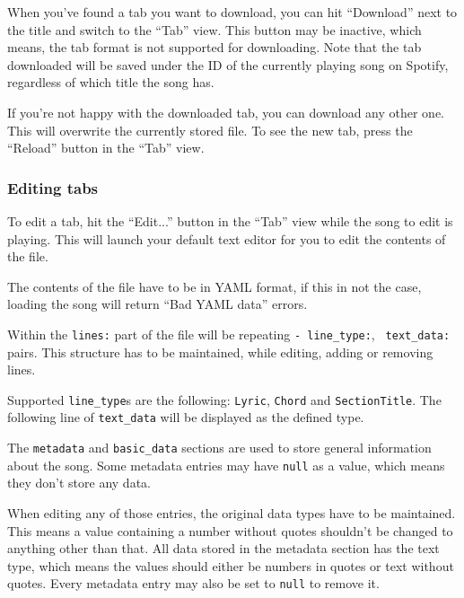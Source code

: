 \documentclass[12pt, a4paper]{article}
\begin{document}
                                When you've found a tab you want to download, you can hit ``Download'' next to the title and switch to the ``Tab'' view.
                                This button may be inactive, which means, the tab format is not supported for downloading.
                                Note that the tab downloaded will be saved under the ID of the currently playing song on Spotify, regardless of which title the song has.

                                If you're not happy with the downloaded tab, you can download any other one. This will overwrite the currently stored file. To see the new tab, press the ``Reload'' button in the ``Tab'' view.

                        \subsubsection{Editing tabs}
                                To edit a tab, hit the ``Edit...'' button in the ``Tab'' view while the song to edit is playing. This will launch your default text editor for you to edit the contents of the file.

                                The contents of the file have to be in YAML format, if this in not the case, loading the song will return ``Bad YAML data'' errors.

                                Within the \texttt{lines:} part of the file will be repeating \texttt{- line\_type:}, \texttt{  text\_data:} pairs. This structure has to be maintained, while editing, adding or removing lines.
                                
                                Supported \texttt{line\_type}s are the following: \texttt{Lyric}, \texttt{Chord} and \texttt{SectionTitle}. The following line of \texttt{text\_data} will be displayed as the defined type.\hfill\break

                                The \texttt{metadata} and \texttt{basic\_data} sections are used to store general information about the song. Some metadata entries may have \texttt{null} as a value, which means they don't store any data.
                                
                                When editing any of those entries, the original data types have to be maintained. This means a value containing a number without quotes shouldn't be changed to anything other than that. All data stored in the metadata section has the text type, which means the values should either be numbers in quotes or text without quotes. Every metadata entry may also be set to \texttt{null} to remove it.
\end{document}
